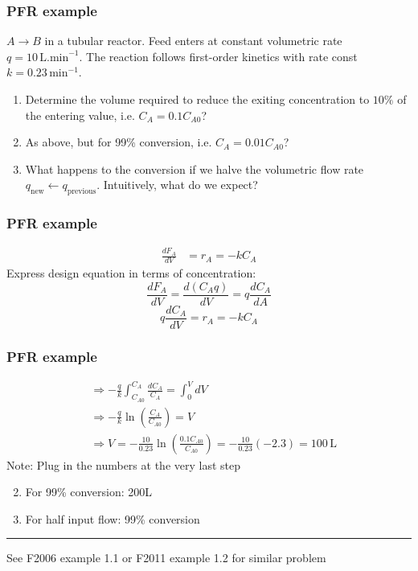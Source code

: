 \begin{frame}\frametitle{PFR example}
	$A\longrightarrow B$ in a tubular reactor. Feed enters at constant volumetric rate $q = 10\,\text{L.min}^{-1}$. The reaction follows first-order kinetics with rate const $k = 0.23\,\text{min}^{-1}$. 
	\vspace{12pt}
	\begin{enumerate}
		\item	Determine the volume required to reduce the exiting concentration to $10\%$ of the entering value, i.e. $C_A = 0.1 C_{A0}$?
		\item	As above, but for 99\% conversion, i.e. $C_A = 0.01 C_{A0}$?
		\item	What happens to the conversion if we halve the volumetric flow rate $q_\text{new} \leftarrow q_\text{previous}$. Intuitively, what do we expect?
	\end{enumerate}
\end{frame}

\begin{frame}\frametitle{PFR example}
	\begin{align*}
		\frac{dF_A}{dV} &= r_A = -kC_A
	\end{align*}
	Express design equation in terms of concentration: 
	$$\frac{dF_A}{dV} = \frac{d(C_Aq)}{dV} = q\frac{dC_A}{dA}$$ 
	$$q\frac{dC_A}{dV} = r_A = -kC_A$$
\end{frame}

\begin{frame}\frametitle{PFR example}
	\begin{align*}
		&\Rightarrow -\frac{q}{k}\int_{C_{A0}}^{C_A}\frac{dC_A}{C_A} = \int_0^VdV\\
		&\Rightarrow -\frac{q}{k}\ln\left(\frac{C_A}{C_{A0}} \right) = V\\
		&\Rightarrow V = -\frac{10}{0.23}\ln\left(\frac{0.1C_{A0}}{C_{A0}} \right) = -\frac{10}{0.23}(-2.3) = 100\,\text{L}
	\end{align*}
	Note: Plug in the numbers at the very last step
	\begin{enumerate}
		\setcounter{enumi}{1}
		\item	For 99\% conversion: 200L
		\item	For half input flow: 99\% conversion {\color{myGreen}{\small (increased!)}}
	\end{enumerate}
	\vspace{4pt}
	\hrule
	\vspace{4pt}
	\scriptsize See F2006 example 1.1 or F2011 example 1.2 for similar problem
\end{frame}

